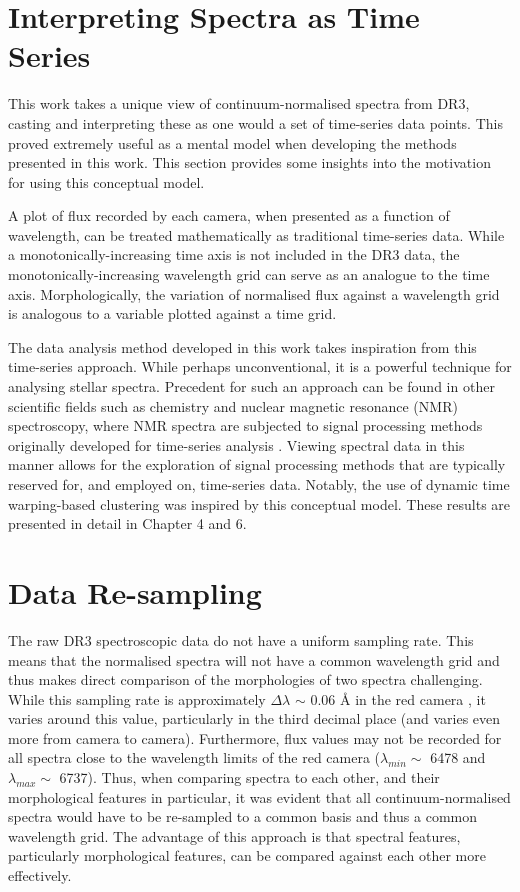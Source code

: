 \section{Interpreting Spectra as Time Series}

This work takes a unique view of continuum-normalised spectra from DR3, casting and interpreting these as one would a set of time-series data points. This proved extremely useful as a mental model when developing the methods presented in this work. This section provides some insights into the motivation for using this conceptual model. 

A plot of flux recorded by each camera, when presented as a function of wavelength, can be treated mathematically as traditional time-series data. While a monotonically-increasing time axis is not included in the DR3 data, the monotonically-increasing wavelength grid can serve as an analogue to the time axis. Morphologically, the variation of normalised flux against a wavelength grid is analogous to a variable plotted against a time grid.

The data analysis method developed in this work takes inspiration from this time-series approach. While perhaps unconventional, it is a powerful technique for analysing stellar spectra. Precedent for such an approach can be found in other scientific fields such as chemistry and nuclear magnetic resonance (NMR) spectroscopy, where NMR spectra are subjected to signal processing methods originally developed for time-series analysis \citep{nielsen2019practical}. Viewing spectral data in this manner allows for the exploration of signal processing methods that are typically reserved for, and employed on, time-series data. Notably, the use of dynamic time warping-based clustering was inspired by this conceptual model. These results are presented in detail in Chapter 4 and 6.

\section{Data Re-sampling}

The raw DR3 spectroscopic data do not have a uniform sampling rate. This means that the normalised spectra will not have a common wavelength grid and thus makes direct comparison of the morphologies of two spectra challenging. While this sampling rate is approximately $\Delta\lambda$ $\sim$ 0.06 \r{A} in the red camera \citep{vcotar2021galah}, it varies around this value, particularly in the third decimal place (and varies even more from camera to camera). Furthermore, flux values may not be recorded for all spectra close to the wavelength limits of the red camera ($\lambda_{min} \sim$ 6478 and $\lambda_{max} \sim$ 6737). Thus, when comparing spectra to each other, and their morphological features in particular, it was evident that all continuum-normalised spectra would have to be re-sampled to a common basis and thus a common wavelength grid. The advantage of this approach is that spectral features, particularly morphological features, can be compared against each other more effectively.

